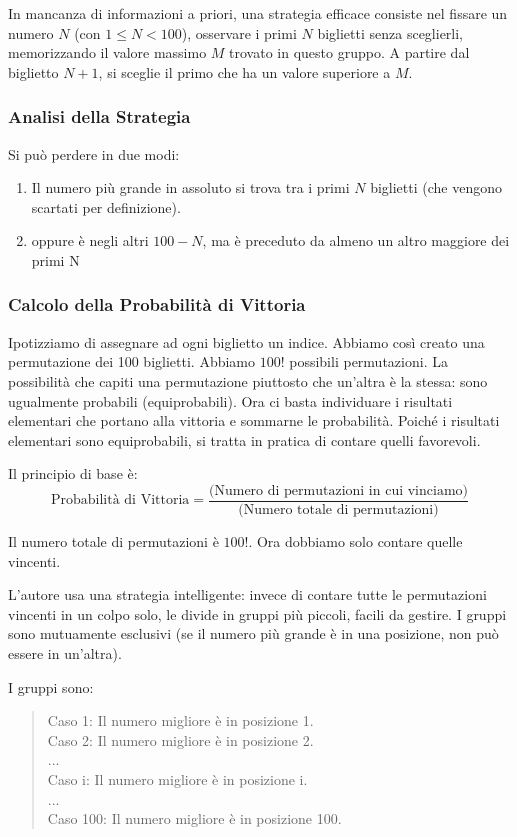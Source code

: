 In mancanza di informazioni a priori, una strategia efficace consiste nel fissare un numero $N$ (con $1 \le N < 100$), osservare i primi $N$ biglietti senza sceglierli, memorizzando il valore massimo $M$ trovato in questo gruppo. A partire dal biglietto $N+1$, si sceglie il primo che ha un valore superiore a $M$.

\subsubsection{Analisi della Strategia}
Si può perdere in due modi:
\begin{enumerate}
    \item Il numero più grande in assoluto si trova tra i primi $N$ biglietti (che vengono scartati per definizione).
    \item oppure è negli altri $100 - N$, ma è preceduto da almeno un altro maggiore dei primi N
\end{enumerate}

\subsubsection{Calcolo della Probabilità di Vittoria}
Ipotizziamo di assegnare ad ogni biglietto un indice. Abbiamo così creato una permutazione dei 100 biglietti. Abbiamo $100!$ possibili permutazioni. La possibilità che capiti una permutazione piuttosto che un'altra è la stessa: sono ugualmente probabili (equiprobabili). Ora ci basta individuare i risultati elementari che portano alla vittoria e sommarne le probabilità. Poiché i risultati elementari sono equiprobabili, si tratta in pratica di contare quelli favorevoli.

Il principio di base è:
\[ \text{Probabilità di Vittoria} = \frac{\text{(Numero di permutazioni in cui vinciamo)}}{\text{(Numero totale di permutazioni)}} \]

Il numero totale di permutazioni è $100!$. Ora dobbiamo solo contare quelle vincenti.

L'autore usa una strategia intelligente: invece di contare tutte le permutazioni vincenti in un colpo solo, le divide in gruppi più piccoli, facili da gestire. I gruppi sono mutuamente esclusivi (se il numero più grande è in una posizione, non può essere in un'altra).

I gruppi sono:
\begin{quote}
    Caso 1: Il numero migliore è in posizione 1. \\
    Caso 2: Il numero migliore è in posizione 2. \\
    ... \\
    Caso i: Il numero migliore è in posizione i. \\
    ... \\
    Caso 100: Il numero migliore è in posizione 100.
\end{quote}

